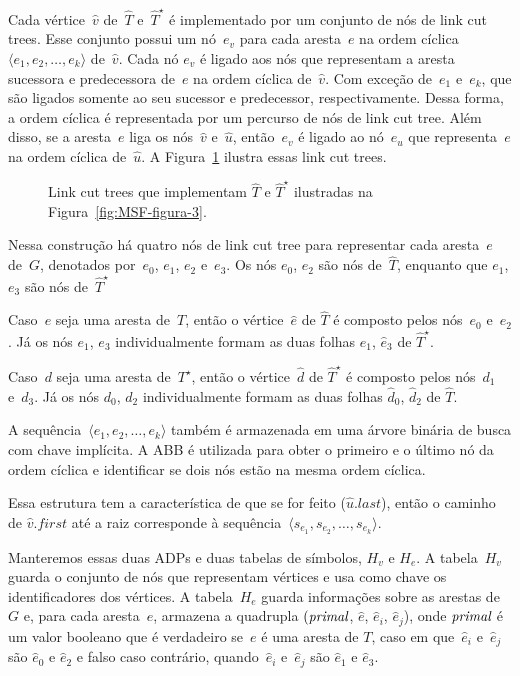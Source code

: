 Cada vértice~$\hat v$ de~$\hat T$ e~$\hat T^\star$ é implementado por um conjunto de nós de link cut trees.
Esse conjunto possui um nó~$e_v$ para cada aresta~$e$ na ordem cíclica~$\langle e_1, e_2, \ldots, e_k\rangle$ de~$\hat v$.
Cada nó $e_v$ é ligado aos nós que representam a aresta sucessora e predecessora de~$e$ na ordem cíclica de~$\hat v$.
Com exceção de~$e_1$ e~$e_k$, que são ligados somente ao seu sucessor e predecessor, respectivamente.
Dessa forma, a ordem cíclica é representada por um percurso de nós de link cut tree.
Além disso, se a aresta~$e$ liga os nós~$\hat v$ e~$\hat u$, então~$e_v$ é ligado ao nó~$e_u$ que representa~$e$ na ordem cíclica de~$\hat u$.
A Figura~\ref{fig:MSF-figura-4} ilustra essas link cut trees.

\begin{figure}[htb]
\scalebox{1.5}{
\centering

}
\caption{Link cut trees que implementam $\hat T$ e $\hat T^\star$ ilustradas na Figura~\ref{fig:MSF-figura-3}.}
\label{fig:MSF-figura-4}
\end{figure}

Nessa construção há quatro nós de link cut tree para representar cada aresta~$e$ de~$G$, denotados por~$e_0$, $e_1$, $e_2$ e~$e_3$.
Os nós $e_0$, $e_2$ são nós de~$\hat T$, enquanto que $e_1$, $e_3$ são nós de~$\hat T^\star$

Caso~$e$ seja uma aresta de~$T$, então o vértice~$\hat e$ de $\hat T$ é composto pelos nós~$e_0$ e~$e_2$.
Já os nós $e_1$, $e_3$ individualmente formam as duas folhas $\hat e_1$, $\hat e_3$ de $\hat T^\star$.

Caso~$d$ seja uma aresta de~$T^\star$, então o vértice~$\hat d$ de $\hat T^\star$ é composto pelos nós~$d_1$ e~$d_3$.
Já os nós $d_0$, $d_2$ individualmente formam as duas folhas $\hat d_0$, $\hat d_2$ de $\hat T$.

A sequência~$\langle e_1, e_2, \ldots, e_k\rangle$ também é armazenada em uma árvore binária de busca com chave implícita.
A ABB é utilizada para obter o primeiro e o último nó da ordem cíclica e identificar se dois nós estão na mesma ordem cíclica.

Essa estrutura tem a característica de que se for feito \linkcutEvert($\hat u$.$last$), então o caminho de $\hat v$.$first$ até a raiz corresponde à sequência~$\langle s_{e_1}, s_{e_2}, \ldots, s_{e_k}\rangle$.

Manteremos essas duas ADPs e duas tabelas de símbolos, $H_v$ e $H_e$. A tabela~$H_v$ guarda o conjunto de nós que representam vértices e usa como chave os identificadores dos vértices.
A tabela~$H_e$ guarda informações sobre as arestas de $G$ e, para cada aresta~$e$, armazena a quadrupla $(\textit{primal}$, $\hat e$, $\hat e_i$, $\hat e_j$), onde $\textit{primal}$ é um valor booleano que é verdadeiro se~$e$ é uma aresta de $T$, caso em que~$\hat e_i$ e~$\hat e_j$ são $\hat e_0$ e $\hat e_2$ e falso caso contrário, quando~$\hat e_i$ e~$\hat e_j$ são $\hat e_1$ e $\hat e_3$.

